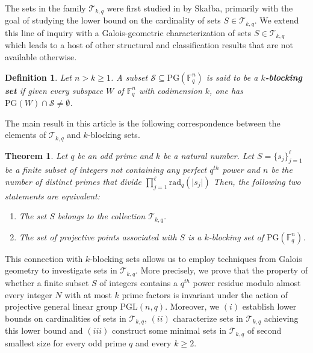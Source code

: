\documentclass[12pt]{amsart}
\newtheorem{theorem}{Theorem}[section]
\newtheorem{definition}{Definition}
\newcommand{\PG}{\mathrm{PG}}
\begin{document}
The sets in the family $\mathcal{T}_{k,q}$ were first studied in \cite{skalba2004alternatives} by Skałba, primarily with the goal of studying the lower bound on the cardinality of sets $S \in\mathcal{T}_{k,q}$. We extend this line of inquiry with a Galois-geometric characterization of sets $S\in\mathcal{T}_{k,q}$ which leads to a host of other structural and classification results that are not available otherwise. 

\begin{definition}
Let $n > k \geq 1$. A subset $\mathcal{S}\subseteq\PG(\mathbb{F}_{q}^{n})$ is said to be a \textbf{$k$-blocking set} if given every subspace $W$ of $\mathbb{F}_{q}^{n}$ with codimension $k$, one has $\PG(W) \cap \mathcal{S} \neq\emptyset$.
\label{defnblocking} 
\end{definition}
The main result in this article is the following correspondence between the elements of $\mathcal{T}_{k,q}$ and $k$-blocking sets. 

\begin{theorem} 
Let $q$ be an odd prime and $k$ be a natural number. Let $S = \{s_{j}\}_{j=1}^{\ell}$ be a finite subset of integers not containing any perfect $q^{th}$ power and $n$ be the number of distinct primes that divide $\prod_{j=1}^{\ell} \text{rad}_{q}(\lvert s_{j} \rvert)$ Then, the following two statements are equivalent:
\begin{enumerate}
    \item The set $S$ belongs to the collection $\mathcal{T}_{k,q}$. 

    \item The set of projective points associated with $S$ is a $k$-blocking set of $\PG(\mathbb{F}_{q}^{n})$. 
\end{enumerate}
\label{mainresult}
\end{theorem}


This connection with $k$-blocking sets allows us to employ techniques from Galois geometry to investigate sets in $\mathcal{T}_{k,q}$. More precisely, we prove that the property of whether a finite subset $S$ of integers contains a $q^{th}$ power residue modulo almost every integer $N$ with at most $k$ prime factors is invariant under the action of projective general linear group $\mathrm{PGL}(n, q)$. Moreover, we $(i)$ establish lower bounds on cardinalities of sets in $\mathcal{T}_{k,q}$, $(ii)$ characterize sets in $\mathcal{T}_{k,q}$ achieving this lower bound and $(iii)$ construct some minimal sets in $\mathcal{T}_{k,q}$ of second smallest size for every odd prime $q$ and every $k \geq 2$.
\end{document}
